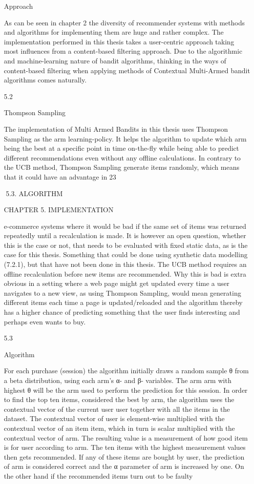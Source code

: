 Approach

As can be seen in chapter 2 the diversity of recommender systems with methods and
algorithms for implementing them are huge and rather complex. The implementation
performed in this thesis takes a user-centric approach taking most influences from a
content-based filtering approach. Due to the algorithmic and machine-learning nature
of bandit algorithms, thinking in the ways of content-based filtering when applying
methods of Contextual Multi-Armed bandit algorithms comes naturally.

5.2

Thompson Sampling

The implementation of Multi Armed Bandits in this thesis uses Thompson Sampling
as the arm learning-policy. It helps the algorithm to update which arm being the best
at a specific point in time on-the-fly while being able to predict different recommendations even without any offline calculations. In contrary to the UCB method, Thompson
Sampling generate items randomly, which means that it could have an advantage in
23

5.3. ALGORITHM

CHAPTER 5. IMPLEMENTATION

e-commerce systems where it would be bad if the same set of items was returned repeatedly until a recalculation is made. It is however an open question, whether this is the
case or not, that needs to be evaluated with fixed static data, as is the case for this thesis. Something that could be done using synthetic data modelling (7.2.1), but that have
not been done in this thesis. The UCB method requires an offline recalculation before
new items are recommended. Why this is bad is extra obvious in a setting where a web
page might get updated every time a user navigates to a new view, as using Thompson
Sampling, would mean generating different items each time a page is updated/reloaded
and the algorithm thereby has a higher chance of predicting something that the user
finds interesting and perhaps even wants to buy.

5.3

Algorithm

For each purchase (session) the algorithm initially draws a random sample θ from a beta
distribution, using each arm’s α- and β- variables. The arm arm with highest θ will
be the arm used to perform the prediction for this session. In order to find the top
ten items, considered the best by arm, the algorithm uses the contextual vector of the
current user user together with all the items in the dataset. The contextual vector of
user is element-wise multiplied with the contextual vector of an item item, which in
turn is scalar multiplied with the contextual vector of arm. The resulting value is a
measurement of how good item is for user according to arm. The ten items with the
highest measurement values then gets recommended. If any of these items are bought
by user, the prediction of arm is considered correct and the α parameter of arm is
increased by one. On the other hand if the recommended items turn out to be faulty

